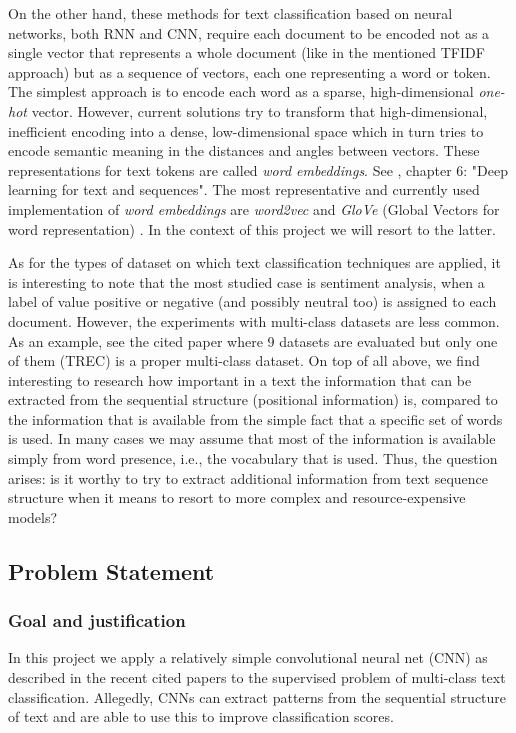 \documentclass[10pt,journal,compsoc, onecolumn]{IEEEtran}
\begin{document}
On the other hand, these methods for text classification based on neural networks, both RNN and CNN, require each document to be encoded not as a single vector that represents a whole document (like in the mentioned TFIDF approach) but as a sequence of vectors, each one representing a word or token. The simplest approach is to encode each word as a sparse, high-dimensional \emph{one-hot} vector. However, current solutions try to transform that high-dimensional, inefficient encoding into a dense, low-dimensional space which in turn tries to encode semantic meaning in the distances and angles between vectors. These representations for text tokens are called \emph{word embeddings}. See \cite{Chollet}, chapter 6: "Deep learning for text and sequences". The most representative and currently used implementation of \emph{word embeddings} are \emph{word2vec} \cite{word2vec} and \emph{GloVe} (Global Vectors for word representation) \cite{Pennington}. In the context of this project we will resort to the latter.

As for the types of dataset on which text classification techniques are applied, it is interesting to note that the most studied case is sentiment analysis, when a label of value positive or negative (and possibly neutral too) is assigned to each document. However, the experiments with multi-class datasets are less common. As an example, see the cited paper \cite{Zhang} where 9 datasets are evaluated but only one of them (TREC) is a proper multi-class dataset. On top of all above, we find interesting to research how important in a text the information that can be extracted from the sequential structure (positional information) is, compared to the information that is available from the simple fact that a specific set of words is used. In many cases we may assume that most of the information is available simply from word presence, i.e., the vocabulary that is used. Thus, the question arises: is it worthy to try to extract additional information from text sequence structure when it means to resort to more complex and resource-expensive models?

\subsection{Problem Statement}

\subsubsection{Goal and justification}
In this project we apply a relatively simple convolutional neural net (CNN) as described in the recent cited papers \cite{Kim, Zhang} to the supervised problem of multi-class text classification. Allegedly, CNNs can extract patterns from the sequential structure of text and are able to use this to improve classification scores. 
\end{document}
